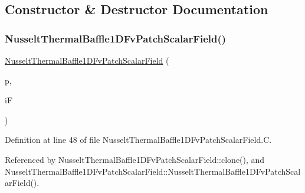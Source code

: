 \subsection{Constructor \& Destructor Documentation}
\mbox{\label{classFoam_1_1compressible_1_1NusseltThermalBaffle1DFvPatchScalarField_a931c11847a4cceb91f8dcb438305e83d}} 
\subsubsection{\texorpdfstring{Nusselt\+Thermal\+Baffle1\+D\+Fv\+Patch\+Scalar\+Field()}{NusseltThermalBaffle1DFvPatchScalarField()}\hspace{0.1cm}{\footnotesize\ttfamily [1/5]}}
{\footnotesize\ttfamily \hyperlink{classFoam_1_1compressible_1_1NusseltThermalBaffle1DFvPatchScalarField}{Nusselt\+Thermal\+Baffle1\+D\+Fv\+Patch\+Scalar\+Field} (\begin{DoxyParamCaption}\item[{const fv\+Patch \&}]{p,  }\item[{const Dimensioned\+Field$<$ scalar, vol\+Mesh $>$ \&}]{iF }\end{DoxyParamCaption})}



Definition at line 48 of file Nusselt\+Thermal\+Baffle1\+D\+Fv\+Patch\+Scalar\+Field.\+C.



Referenced by Nusselt\+Thermal\+Baffle1\+D\+Fv\+Patch\+Scalar\+Field\+::clone(), and Nusselt\+Thermal\+Baffle1\+D\+Fv\+Patch\+Scalar\+Field\+::\+Nusselt\+Thermal\+Baffle1\+D\+Fv\+Patch\+Scalar\+Field().

